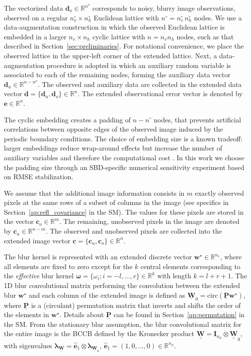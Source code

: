 \documentclass[12pt]{article}
\newcommand{\mycirc}[1] {\underline{\bm{#1}}}
\newcommand{\mybcirc}[1] {\underline{\underline{\bm{#1}}}}
\begin{document}
The vectorized data $\bm{d}_o \in \mathbb{R}^{n^{o}}$ corresponds to noisy, blurry image observations, observed on a regular $n_v^{\circ} \times n_h^{\circ}$ Euclidean lattice with $n^{\circ} = n_v^{\circ} \, n_h^{\circ}$ nodes. 
We use a data-augmentation construction in which the observed Euclidean lattice is embedded in a larger  $n_v \times n_h$  cyclic lattice with $n=n_vn_h$ nodes, such as that described in Section~\ref{sec:preliminaries}. For notational convenience, we place the observed lattice in the upper-left corner of the extended lattice.
Next, a data-augmentation procedure is adopted in which an auxiliary random variable is associated to each of the remaining nodes, forming the auxiliary data vector $\bm{d}_u \in \mathbb{R}^{n - n^{o}}$. 
The observed and auxiliary data are collected in the extended data vector $\bm{d} = \{\bm{d}_u, \bm{d}_o\}\in \mathbb{R}^n$. The extended observational error vector is denoted by $\bm{e} \in \mathbb{R}^n$. 

The cyclic embedding creates a padding of $n-n^{\circ}$ nodes, that prevents artificial correlations between opposite edges of the observed image induced by the periodic boundary conditions.
The choice of embedding size is a known tradeoff: larger embeddings reduce wrap-around effects but increase the number of auxiliary variables and therefore the computational cost \citep{Wood01121994, RueHeld2005, stroud2017bayesian}. In this work we choose the padding size through an SBD-specific numerical sensitivity experiment based on RMSE stabilization.

We assume that the additional image information consists in $m$ exactly observed pixels at the same rows of a subset of columns in the image (see specifics in Section~\ref{ap:refl_covariance} in the SM). The values for these pixels are stored in the vector $\bm{c}_o \in \mathbb{R}^{m}$. The remaining, unobserved pixels in the image are denoted by $\bm{c}_u \in \mathbb{R}^{n-m}$. The observed and unobserved pixels are collected into the extended image vector $\bm{c} = \{\bm{c}_u, \bm{c}_o\} \in \mathbb{R}^{n}$.

The blur kernel is represented with an extended discrete vector $\bm{w}^{\star} \in \mathbb{R}^{n_{v}}$, where all elements are fixed to zero except for the $k$ central elements corresponding to the \textit{effective} blur kernel $\bm{\omega}=\{\omega_i;i=-l,\ldots,r\} \in \mathbb{R}^k$ with length $k=l+r+1$. 
The 1D blur convolutional matrix  performing the convolution between the extended blur $\bm{w}^{\star}$ and each column of the extended image is defined as $\mycirc{W}_0 = \text{circ}(\mycirc{P}\bm{w}^{\star})$, where $\mycirc{P}$ is a (circulant) permutation matrix that inverts and shifts the order of the elements in $\bm{w}^{\star}$.  Details about $\mycirc{P}$  can be found in Section~\ref{ap:permutation} in the SM.
From the stationary blur assumption, the blur convolutional matrix for the entire image is the BCCB defined by the Kronecker product $\mybcirc{W}=\bm{I}_{n_h} \otimes \mybcirc{W}_0$, with eigenvalues $\bm{\lambda}_{\mybcirc{W}} = \hat{\bm{e}}_{1} \otimes \bm{\lambda}_{\mycirc{W}_0}$, $\hat{\bm{e}}_{1}=(1, 0, \ldots, 0) \in \mathbb{R}^{n_h}$.
\end{document}
